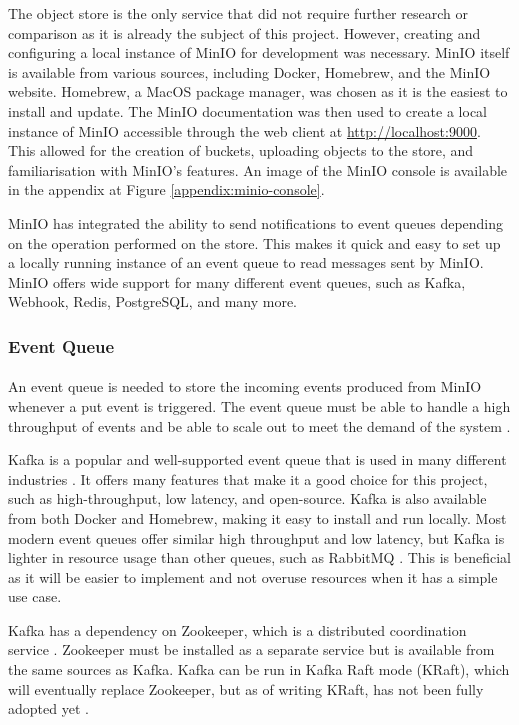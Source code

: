 \documentclass[12pt, conference, final, a4paper, onecolumn, compsoc]{IEEEtran}
\begin{document}
The object store is the only service that did not require further research or
comparison as it is already the subject of this project. However, creating and
configuring a local instance of MinIO for development was necessary. MinIO
itself is available from various sources, including Docker, Homebrew, and the
MinIO website. Homebrew, a MacOS package manager, was chosen as it is the
easiest to install and update. The MinIO documentation was then used to create a
local instance of MinIO accessible through the web client
at \url{http://localhost:9000}. This allowed for the creation of buckets,
uploading objects to the store, and familiarisation with MinIO's features. An
image of the MinIO console is available in the appendix at Figure
\ref{appendix:minio-console}.

MinIO has integrated the ability to send notifications to event queues depending
on the operation performed on the store. This makes it quick and easy to set up
a locally running instance of an event queue to read messages sent by MinIO.
MinIO offers wide support for many different event queues, such as Kafka,
Webhook, Redis, PostgreSQL, and many more.

\subsubsection*{Event Queue}
\paragraph{}

An event queue is needed to store the incoming events produced from MinIO
whenever a put event is triggered. The event queue must be able to handle a high
throughput of events and be able to scale out to meet the demand of the system
\citep{event-driven-arch}.

Kafka is a popular and well-supported event queue that is used in many different
industries \citep{event-driven-arch}. It offers many features that make it a
good choice for this project, such as high-throughput, low latency, and
open-source. Kafka is also available from both Docker and Homebrew, making it
easy to install and run locally. Most modern event queues offer similar high
throughput and low latency, but Kafka is lighter in resource usage than other
queues, such as RabbitMQ \citep{kafka-rabbitmq}. This is beneficial as it will
be easier to implement and not overuse resources when it has a simple use case.

Kafka has a dependency on Zookeeper, which is a distributed coordination service
\citep{event-driven-arch}. Zookeeper must be installed as a separate service but
is available from the same sources as Kafka. Kafka can be run in Kafka Raft mode
(KRaft), which will eventually replace Zookeeper, but as of writing KRaft, has
not been fully adopted yet \citep{kafka-raft}.
\end{document}
